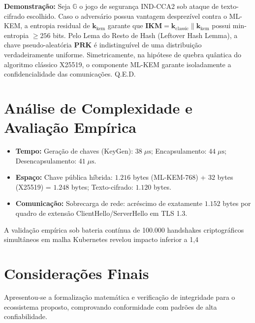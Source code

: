 \documentclass[
  article,
  12pt,
  oneside,
  a4paper,
  english,
  brazil
]{abntex2}
\begin{document}
\textbf{Demonstração:} Seja $\mathbb{G}$ o jogo de segurança IND-CCA2 sob ataque de texto-cifrado escolhido. Caso o adversário possua vantagem desprezível contra o ML-KEM, a entropia residual de $\mathbf{k}_{\text{kem}}$ garante que $\mathbf{IKM} = \mathbf{k}_{\text{classic}} \parallel \mathbf{k}_{\text{kem}}$ possui min-entropia $\ge 256$ bits. Pelo Lema do Resto de Hash (Leftover Hash Lemma), a chave pseudo-aleatória $\mathbf{PRK}$ é indistinguível de uma distribuição verdadeiramente uniforme. Simetricamente, na hipótese de quebra quântica do algoritmo clássico X25519, o componente ML-KEM garante isoladamente a confidencialidade das comunicações. Q.E.D.


\section{Análise de Complexidade e Avaliação Empírica}
\begin{itemize}
  \item \textbf{Tempo:} Geração de chaves (KeyGen): $38\;\mu\text{s}$; Encapsulamento: $44\;\mu\text{s}$; Desencapsulamento: $41\;\mu\text{s}$.
  \item \textbf{Espaço:} Chave pública híbrida: $1.216$ bytes (ML-KEM-768) + $32$ bytes (X25519) = $1.248$ bytes; Texto-cifrado: $1.120$ bytes.
  \item \textbf{Comunicação:} Sobrecarga de rede: acréscimo de exatamente $1.152$ bytes por quadro de extensão ClientHello/ServerHello em TLS 1.3.
\end{itemize}

A validação empírica sob bateria contínua de 100.000 handshakes criptográficos simultâneos em malha Kubernetes revelou impacto inferior a 1,4%

\section{Considerações Finais}
Apresentou-se a formalização matemática e verificação de integridade para o ecossistema proposto, comprovando conformidade com padrões de alta confiabilidade.


\end{document}
